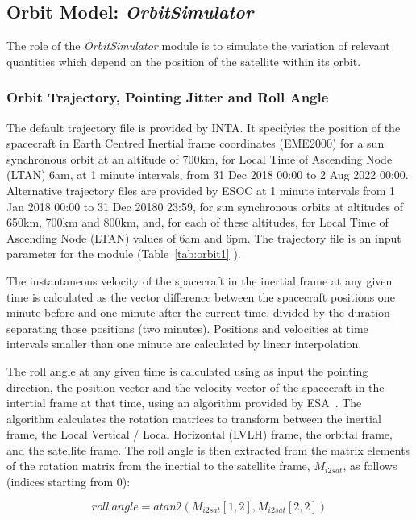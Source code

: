 \documentclass[11pt]{article}      %
\def\HCode#1{}
\def\htmlanchor#1{\HCode{<a id="#1"></a>}}
\begin{document}
\clearpage
\htmlanchor{OrbitSimulator}
\subsection{Orbit Model:  {\it OrbitSimulator}}
\label{sec:OrbitSimulator}

The role of the {\it OrbitSimulator} module is to simulate the variation of relevant quantities which depend on the position of the satellite within its orbit.

\subsubsection{Orbit Trajectory, Pointing Jitter and Roll Angle}

The default trajectory file is provided by INTA. It specifyies the position of the spacecraft in Earth Centred Inertial frame coordinates (EME2000) for a sun synchronous orbit at an altitude of 700km, for Local Time of Ascending Node (LTAN)  6am, at 1 minute intervals, from 31 Dec 2018 00:00 to 2 Aug 2022 00:00. Alternative trajectory files are provided by ESOC at 1 minute intervals from 1 Jan 2018 00:00 to 31 Dec 20180 23:59, for sun synchronous orbits at altitudes of 650km, 700km and 800km, and, for each of these altitudes, for Local Time of Ascending Node (LTAN) values of 6am and 6pm. The trajectory file is an input parameter for the module (Table~\ref{tab:orbit1} ).

The instantaneous velocity of the spacecraft in the inertial frame at any given time is calculated as the vector difference between the spacecraft positions one minute before and one minute after the current time, divided by the duration separating those positions (two minutes). Positions and velocities at time intervals smaller than one minute are calculated by linear interpolation.

The roll angle at any given time is calculated using as input the pointing direction, the position vector and the velocity vector of the spacecraft in the intertial frame at that time, using an algorithm provided by ESA~\cite{rollAngleAlgo}. The algorithm calculates the rotation matrices to transform between the inertial frame, the Local Vertical / Local Horizontal (LVLH) frame, the orbital frame, and the satellite frame. The roll angle is then extracted from the matrix elements of the rotation matrix from the inertial to the satellite frame, $M_{i2sat}$, as follows (indices starting from 0):

\[roll\ angle = atan2 ( M_{i2sat}[1,2], M_{i2sat}[2,2] )\]
\end{document}
